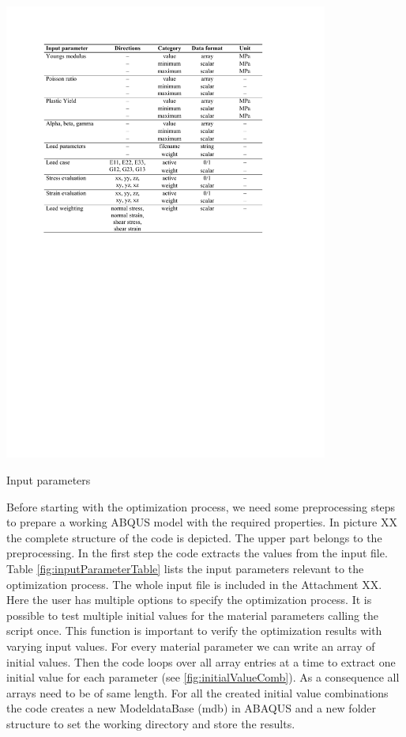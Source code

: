     \begin{table}[H]
		\centering
        \includegraphics[width=0.8\textwidth]{inputParameterTable.pdf}
		\caption{Input parameters}
		\label{tab:inputParameterTable}
	\end{table}
    
    Before starting with the optimization process, we need some preprocessing steps to prepare a working ABQUS model with the required properties. In picture XX the complete structure of the code is depicted. The upper part belongs to the preprocessing. In the first step the code extracts the values from the input file. Table \autoref{fig:inputParameterTable} lists the input parameters relevant to the optimization process. The whole input file is included in the Attachment XX. Here the user has multiple options to specify the optimization process. It is possible to test multiple initial values for the material parameters calling the script once. This function is important to verify the optimization results with varying input values. For every material parameter we can write an array of initial values. Then the code loops over all array entries at a time to extract one initial value for each parameter (see \autoref{fig:initialValueComb}). As a consequence all arrays need to be of same length. For all the created initial value combinations the code creates a new ModeldataBase (mdb) in ABAQUS and a new folder structure to set the working directory and store the results.
    
